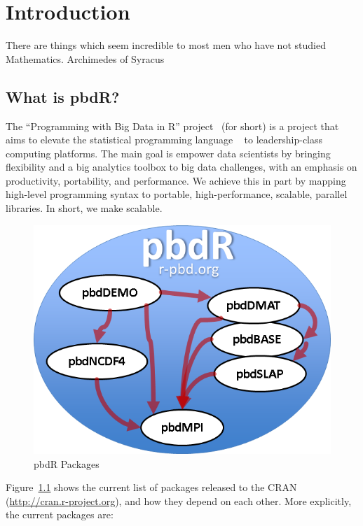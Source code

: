 \chapter[Introduction]{Introduction}
\label{sec:introduction}

% 

\inspire%
{There are things which seem incredible to most men who have not studied Mathematics.}%
{Archimedes of Syracus}



\section{What is pbdR?}
The ``Programming with Big Data in R'' project~\citep{pbdR2012}
(\pbdR for short) is a project that aims to elevate the statistical programming
language ~\citep{Rcore} to leadership-class computing platforms.
The main goal is empower data scientists by bringing flexibility and a big
analytics toolbox to big data challenges, with an emphasis on productivity,
portability, and performance.  We achieve this in part by mapping high-level
programming syntax to portable, high-performance, scalable, parallel libraries.
In short, we make  scalable.

\begin{figure}[h]
 \centering
 \includegraphics[scale=.65]{pbdDEMO-include/pics/pbdR.png}
 \caption{pbdR Packages}
 \label{fig:pbdrpackages}
\end{figure}

Figure~\ref{fig:pbdrpackages} shows the current list of \pbdR
packages released
to the CRAN (\url{http://cran.r-project.org}), and how they depend on each
other. More explicitly, the current \pbdR packages
\citep{Chen2012pbdMPIpackage,Chen2012pbdSLAPpackage,Schmidt2012pbdBASEpackage,
Schmidt2012pbdDMATpackage,Patel2013pbdNCDF4package,Schmidt2013pbdDEMOpackage}
are:

